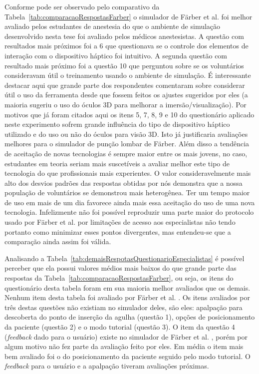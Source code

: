 Conforme pode ser observado pelo comparativo da Tabela~\ref{tab:comparacaoRespostasFarber} o simulador de Färber et al. \cite{Farber2008} foi melhor avaliado pelos estudantes de anestesia do que o ambiente de simulação desenvolvido nesta tese foi avaliado pelos médicos anestesistas. A questão com resultados mais próximos foi a 6 que questionava se o controle dos elementos de interação com o dispositivo háptico foi intuitivo. A segunda questão com resultado mais próximo foi a questão 10 que perguntou sobre se os voluntários consideravam útil o treinamento usando o ambiente de simulação. É interessante destacar aqui que grande parte dos respondentes comentaram sobre considerar útil o uso da ferramenta desde que fossem feitos os ajustes sugeridos por eles (a maioria sugeriu o uso do óculos 3D para melhorar a imersão/visualização). Por motivos que já foram citados aqui os itens 5, 7, 8, 9 e 10 do questionário aplicado neste experimento sofrem grande influência do tipo de dispositivo háptico utilizado e do uso ou não do óculos para visão 3D. Isto já justificaria avaliações melhores para o simulador de punção lombar de Färber. Além disso a tendência de aceitação de novas tecnologias é sempre maior entre os mais jovens, no caso, estudantes em teoria seriam mais suscetíveis a avaliar melhor este tipo de tecnologia do que profissionais mais experientes. O valor consideravelmente mais alto dos desvios padrões das respostas obtidas por nós demonstra que a nossa população de voluntários se demonstrou mais heterogênea. Ter um tempo maior de uso em mais de um dia favorece ainda mais essa aceitação do uso de uma nova tecnologia. Infelizmente não foi possível reproduzir uma parte maior do protocolo usado por Färber et al. \cite{Farber2008} por limitações de acesso aos especialistas não tendo portanto como minimizar esses pontos divergentes, mas entendeu-se que a comparação ainda assim foi válida.

Analisando a Tabela~\ref{tab:demaisRespotasQuestionarioEspecialistas} é possível perceber que ela possui valores médios mais baixos do que grande parte das respostas da Tabela~\ref{tab:comparacaoRespostasFarber}, ou seja, os itens do questionário desta tabela foram em sua maioria melhor avaliados que os demais. Nenhum item desta tabela foi avaliado por Färber et al. \cite{Farber2008}. Os itens avaliados por três destas questões não existiam no simulador deles, são eles: apalpação para descoberta do ponto de inserção da agulha (questão 1), opções de posicionamento da paciente (questão 2) e o modo tutorial (questão 3). O item da questão 4 (\textit{feedback} dado para o usuário) existe no simulador de Färber et al. \cite{Farber2008}, porém por algum motivo não fez parte da avaliação feito por eles. Em média o item mais bem avaliado foi o do posicionamento da paciente seguido pelo modo tutorial. O \textit{feedback} para o usuário e a apalpação tiveram avaliações próximas.